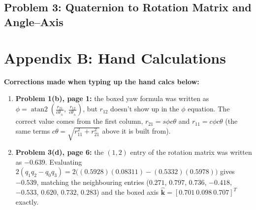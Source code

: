 \documentclass[11pt]{article}
\newcommand{\khat}{\widehat{\bm{k}}}
\newcommand{\atantwo}{\operatorname{atan2}}
\begin{document}
\newpage
\subsection*{Problem 3: Quaternion to Rotation Matrix and Angle--Axis}


\newpage
\section*{Appendix B: Hand Calculations}

\begin{fixnote}
\textbf{Corrections made when typing up the hand calcs below:}
\begin{enumerate}[leftmargin=1.2em, itemsep=4pt]
    \item \textbf{Problem 1(b), page 1:} the boxed yaw formula was written as $\phi = \atantwo\!\left(\frac{r_{21}}{c\theta_{\pm}},\ \frac{r_{12}}{c\theta_{\pm}}\right)$, but $r_{12}$ doesn't show up in the $\phi$ equation. The correct value comes from the first column, $r_{21} = s\phi c\theta$ and $r_{11} = c\phi c\theta$ (the same terms $c\theta = \sqrt{r_{11}^{2}+r_{21}^{2}}$ above it is built from). 
    \item \textbf{Problem 3(d), page 6:} the $(1,2)$ entry of the rotation matrix was written as $-0.639$. Evaluating $2(q_{1}q_{2}-q_{0}q_{3}) = 2\big((0.5928)(0.08311)-(0.5332)(0.5978)\big)$ gives $-0.539$, matching the neighbouring entries ($0.271$, $0.797$, $0.736$, $-0.418$, $-0.533$, $0.620$, $0.732$, $0.283$) and the boxed axis $\khat = [0.701\ 0.098\ 0.707]^{T}$ exactly.
\end{enumerate}
\end{fixnote}


\end{document}
